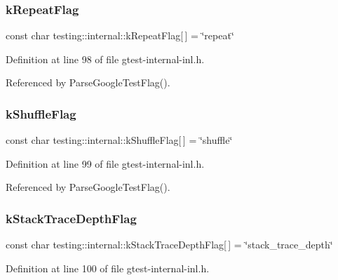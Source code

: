 \subsubsection{\texorpdfstring{k\+Repeat\+Flag}{kRepeatFlag}}
{\footnotesize\ttfamily const char testing\+::internal\+::k\+Repeat\+Flag\mbox{[}$\,$\mbox{]} = \char`\"{}repeat\char`\"{}}



Definition at line 98 of file gtest-\/internal-\/inl.\+h.



Referenced by Parse\+Google\+Test\+Flag().

\mbox{\label{namespacetesting_1_1internal_affd2c1118505cb97d8ff728c95fc722b}} 
\subsubsection{\texorpdfstring{k\+Shuffle\+Flag}{kShuffleFlag}}
{\footnotesize\ttfamily const char testing\+::internal\+::k\+Shuffle\+Flag\mbox{[}$\,$\mbox{]} = \char`\"{}shuffle\char`\"{}}



Definition at line 99 of file gtest-\/internal-\/inl.\+h.



Referenced by Parse\+Google\+Test\+Flag().

\mbox{\label{namespacetesting_1_1internal_ad6f90e66d431ca3a9084408878c2cc77}} 
\subsubsection{\texorpdfstring{k\+Stack\+Trace\+Depth\+Flag}{kStackTraceDepthFlag}}
{\footnotesize\ttfamily const char testing\+::internal\+::k\+Stack\+Trace\+Depth\+Flag\mbox{[}$\,$\mbox{]} = \char`\"{}stack\+\_\+trace\+\_\+depth\char`\"{}}



Definition at line 100 of file gtest-\/internal-\/inl.\+h.



